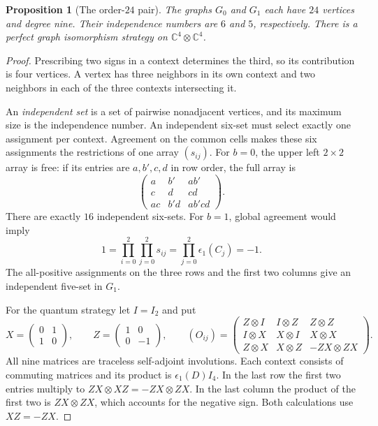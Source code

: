\documentclass[11pt,reqno]{amsart}
\numberwithin{equation}{section}
\newtheorem{proposition}[theorem]{Proposition}
\theoremstyle{definition}
\begin{document}
\begin{proposition}[The order-$24$ pair]\label{prop:upper}
The graphs $G_0$ and $G_1$ each have $24$ vertices and degree nine.
Their independence numbers are $6$ and $5$, respectively. There is a
perfect graph isomorphism strategy on $\mathbb C^4\otimes\mathbb C^4$.
\end{proposition}
\begin{proof}
Prescribing two signs in a context determines the third, so its
contribution is four vertices. A vertex has three neighbors in its own
context and two neighbors in each of the three contexts intersecting it.

An \emph{independent set} is a set of pairwise nonadjacent vertices, and its maximum size is the independence number. An independent six-set must select exactly one assignment per context.
Agreement on the common cells makes these six assignments the restrictions
of one array $(s_{ij})$. For $b=0$, the upper left $2\times2$ array is free:
if its entries are $a,b',c,d$ in row order, the full array is
\[
 \begin{pmatrix}
 a&b'&ab'\\c&d&cd\\ac&b'd&ab'cd
 \end{pmatrix}.
\]
There are exactly $16$ independent six-sets. For $b=1$, global agreement
would imply
\[
 1=\prod_{i=0}^2\prod_{j=0}^2s_{ij}
   =\prod_{j=0}^2\epsilon_1(C_j)=-1 .
\]
The all-positive assignments on the three rows and the first two columns
give an independent five-set in $G_1$.

For the quantum strategy let $I=I_2$ and put
\[
 X=\begin{pmatrix}0&1\\1&0\end{pmatrix},\qquad
 Z=\begin{pmatrix}1&0\\0&-1\end{pmatrix},\qquad
 (O_{ij})=\begin{pmatrix}
 Z\otimes I&I\otimes Z&Z\otimes Z\\
 I\otimes X&X\otimes I&X\otimes X\\
 Z\otimes X&X\otimes Z&-ZX\otimes ZX
 \end{pmatrix}.
\]
All nine matrices are traceless self-adjoint involutions. Each context
consists of commuting matrices and its product is
$\epsilon_1(D)I_4$. In the last row the first two entries multiply to
$ZX\otimes XZ=-ZX\otimes ZX$. In the last column the product of the
first two is $ZX\otimes ZX$, which accounts for the negative sign.
Both calculations use $XZ=-ZX$.


\end{proof}
\end{document}
